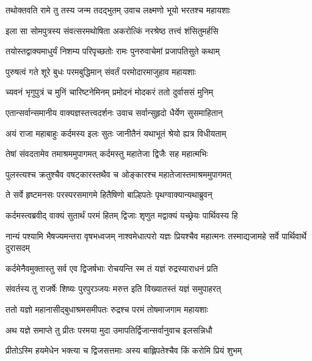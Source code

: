 
\twolineshloka
{तथोक्तवति रामे तु तस्य जन्म तदद्भुतम्}
{उवाच लक्ष्मणो भूयो भरतश्च महायशाः} %

\twolineshloka
{इला सा सोमपुत्रस्य संवत्सरमथोषिता}
{अकरोत्किं नरश्रेष्ठ तत्त्वं शंसितुमर्हसि} %

\twolineshloka
{तयोस्तद्वाक्यमाधुर्यं निशम्य परिपृच्छतोः}
{रामः पुनरुवाचेमां प्रजापतिसुते कथाम्} %

\twolineshloka
{पुरुषत्वं गते शूरे बुधः परमबुद्धिमान्}
{संवर्तं परमोदारमाजुहाव महायशाः} %

\twolineshloka
{च्यवनं भृगुपुत्रं च मुनिं चारिष्टनेमिनम्}
{प्रमोदनं मोदकरं ततो दुर्वाससं मुनिम्} %

\twolineshloka
{एतान्सर्वान्समानीय वाक्यज्ञस्तत्त्वदर्शनः}
{उवाच सर्वान्सुहृदो धैर्येण सुसमाहितान्} %

\twolineshloka
{अयं राजा महाबाहुः कर्दमस्य इलः सुतः}
{जानीतैनं यथाभूतं श्रेयो ह्यत्र विधीयताम्} %

\twolineshloka
{तेषां संवदतामेव तमाश्रममुपागमत्}
{कर्दमस्तु महातेजा द्विजैः सह महात्मभिः} %

\twolineshloka
{पुलस्त्यश्च क्रतुश्चैव वषट्कारस्तथैव च}
{ओङ्कारश्च महातेजास्तमाश्रममुपागमत्} %

\twolineshloka
{ते सर्वे हृष्टमनसः परस्परसमागमे}
{हितैषिणो बाल्हिपतेः पृथग्वाक्यान्यथाब्रुवन्} %

\twolineshloka
{कर्दमस्त्वब्रवीद् वाक्यं सुतार्थं परमं हितम्}
{द्विजाः शृणुत मद्वाक्यं यच्छ्रेयः पार्थिवस्य हि} %

\threelineshloka
{नान्यं पश्यामि भैषज्यमन्तरा वृषभध्वजम्}
{नाश्वमेधात्परो यज्ञः प्रियश्चैव महात्मनः}
{तस्माद्यजामहे सर्वे पार्थिवार्थे दुरासदम्} %

\twolineshloka
{कर्दमेनैवमुक्तास्तु सर्व एव द्विजर्षभाः}
{रोचयन्ति स्म तं यज्ञं रुद्रस्याराधनं प्रति} %

\twolineshloka
{संवर्तस्य तु राजर्षेः शिष्यः पुरपुरञ्जयः}
{मरुत्त इति विख्यातस्तं यज्ञं समुपाहरत्} %

\twolineshloka
{ततो यज्ञो महानासीद्बुधाश्रमसमीपतः}
{रुद्रश्च परमं तोषमाजगाम महायशाः} %

\twolineshloka
{अथ यज्ञे समाप्ते तु प्रीतः परमया मुदा}
{उमापतिर्द्विजान्सर्वानुवाच इलसन्निधौ} %

\twolineshloka
{प्रीतोऽस्मि हयमेधेन भक्त्या च द्विजसत्तमाः}
{अस्य बाह्लिपतेश्चैव किं करोमि प्रियं शुभम्} %

